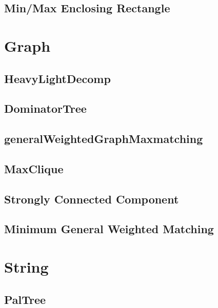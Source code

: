 \documentclass[10pt,twocolumn,oneside]{article}
\begin{document}
\subsection{Min/Max Enclosing Rectangle}


\section{Graph}
\subsection{HeavyLightDecomp}


\newpage

\subsection{DominatorTree}


\newpage

\subsection{generalWeightedGraphMaxmatching}


\subsection{MaxClique}



\subsection{Strongly Connected Component}


\newpage

\subsection{Minimum General Weighted Matching}


\newpage

\section{String}
\subsection{PalTree}

\end{document}
